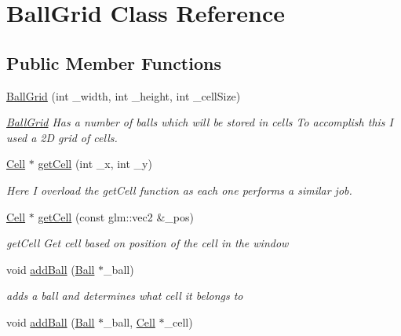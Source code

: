 \hypertarget{classBallGrid}{
\section{BallGrid Class Reference}
\label{classBallGrid}
}
\subsection*{Public Member Functions}
\begin{DoxyCompactItemize}
\item 
\hyperlink{classBallGrid_a7bb8b193b697a26feb24ace417e34f2a}{BallGrid} (int \_\-width, int \_\-height, int \_\-cellSize)
\begin{DoxyCompactList}\small\item\em \hyperlink{classBallGrid}{BallGrid} Has a number of balls which will be stored in cells To accomplish this I used a 2D grid of cells. \item\end{DoxyCompactList}\item 
\hyperlink{structCell}{Cell} $\ast$ \hyperlink{classBallGrid_aa75a6ba9c08cc592917bc4c82ddecab9}{getCell} (int \_\-x, int \_\-y)
\begin{DoxyCompactList}\small\item\em Here I overload the getCell function as each one performs a similar job. \item\end{DoxyCompactList}\item 
\hyperlink{structCell}{Cell} $\ast$ \hyperlink{classBallGrid_a33f4cad0c6381769f2f49996c8bf7512}{getCell} (const glm::vec2 \&\_\-pos)
\begin{DoxyCompactList}\small\item\em getCell Get cell based on position of the cell in the window \item\end{DoxyCompactList}\item 
void \hyperlink{classBallGrid_ab8cc5670a406da6b7bbafdc04b1235b7}{addBall} (\hyperlink{structBall}{Ball} $\ast$\_\-ball)
\begin{DoxyCompactList}\small\item\em adds a ball and determines what cell it belongs to \item\end{DoxyCompactList}\item 
void \hyperlink{classBallGrid_a82fd95975c46e31f204dbf17d858e81c}{addBall} (\hyperlink{structBall}{Ball} $\ast$\_\-ball, \hyperlink{structCell}{Cell} $\ast$\_\-cell)

\end{DoxyCompactItemize}
